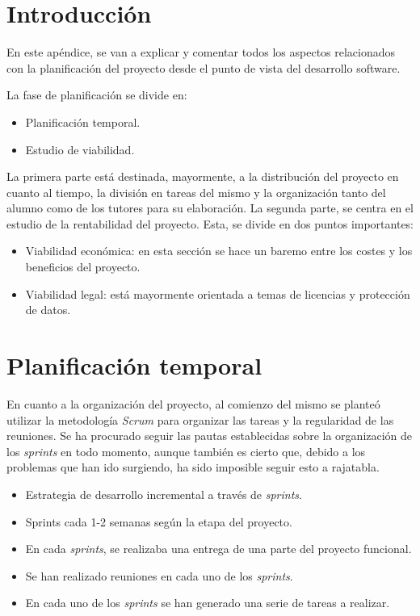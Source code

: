 
\section{Introducción}

En este apéndice, se van a explicar y comentar todos los aspectos relacionados con la planificación del proyecto desde el punto de vista del desarrollo software.

La fase de planificación se divide en:
\begin{itemize}
    \item Planificación temporal.
    \item Estudio de viabilidad.
\end{itemize}

La primera parte está destinada, mayormente, a la distribución del proyecto en cuanto al tiempo, la división en tareas del mismo y la organización tanto del alumno como de los tutores para su elaboración.
La segunda parte, se centra en el estudio de la rentabilidad del proyecto. Esta, se divide en dos puntos importantes:
\begin{itemize}
    \item Viabilidad económica: en esta sección se hace un baremo entre los costes y los beneficios del proyecto.
    \item Viabilidad legal: está mayormente orientada a temas de licencias y protección de datos.
\end{itemize}


\section{Planificación temporal}

En cuanto a la organización del proyecto, al comienzo del mismo se planteó utilizar la metodología \textit{Scrum} para organizar las tareas y la regularidad de las reuniones. 
Se ha procurado seguir las pautas establecidas sobre la organización de los \textit{sprints} en todo momento, aunque también es cierto que, debido a los problemas que han ido surgiendo, ha sido imposible seguir esto a rajatabla.

\begin{itemize}
    \item Estrategia de desarrollo incremental a través de \textit{sprints}.
    \item Sprints cada 1-2 semanas según la etapa del proyecto.
    \item En cada \textit{sprints}, se realizaba una entrega de una parte del proyecto funcional.
    \item Se han realizado reuniones en cada uno de los \textit{sprints}.
    \item En cada uno de los \textit{sprints} se han generado una serie de tareas a realizar.
\end{itemize}

